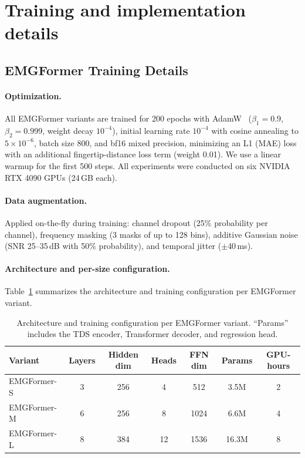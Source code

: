 \documentclass{article}
\newcommand{\model}{EMGFormer}
\begin{document}
\FloatBarrier
\section{Training and implementation details}

\subsection{EMGFormer Training Details}
\label{app:training_details}

\paragraph{Optimization.}
All \model{} variants are trained for 200 epochs with AdamW~\citep{adamw} ($\beta_1=0.9$, $\beta_2=0.999$, weight decay $10^{-4}$), initial learning rate $10^{-4}$ with cosine annealing to $5 \times 10^{-6}$, batch size 800, and bf16 mixed precision, minimizing an L1 (MAE) loss with an additional fingertip-distance loss term (weight 0.01). We use a linear warmup for the first 500 steps. All experiments were conducted on six NVIDIA RTX 4090 GPUs (24\,GB each).

\paragraph{Data augmentation.}
Applied on-the-fly during training: channel dropout (25\% probability per channel), frequency masking (3 masks of up to 128 bins), additive Gaussian noise (SNR 25--35\,dB with 50\% probability), and temporal jitter ($\pm$40\,ms).

\paragraph{Architecture and per-size configuration.}
Table~\ref{tab:training_config} summarizes the architecture and training configuration per \model{} variant.

\begin{table}[h]
\centering
\caption{Architecture and training configuration per \model{} variant. ``Params'' includes the TDS encoder, Transformer decoder, and regression head.}
\label{tab:training_config}
\begin{tabular}{lcccccc}
\toprule
Variant & Layers & Hidden dim & Heads & FFN dim & Params & GPU-hours \\
\midrule
\model{}-S  & 3 & 256 & 4  & 512  & 3.5M  & 2 \\
\model{}-M & 6 & 256 & 8  & 1024 & 6.6M  & 4 \\
\model{}-L  & 8 & 384 & 12 & 1536 & 16.3M & 8 \\
\bottomrule
\end{tabular}
\end{table}
\end{document}

